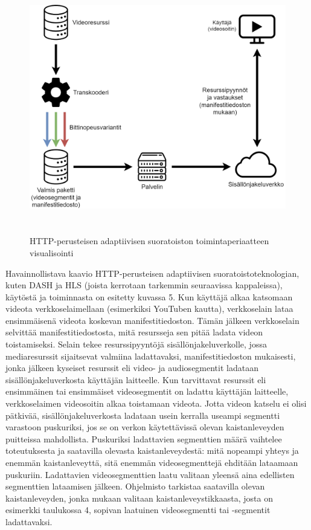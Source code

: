 \documentclass[finnish, 12pt, a4paper, elec, utf8, a-1b, online]{aaltothesis}
\begin{document}
\begin{figure}[htb]
  \centering
  \includegraphics[height=11cm]{./img/abr-streaming.png}
  \caption{HTTP-perusteisen adaptiivisen suoratoiston toimintaperiaatteen visualisointi \label{kuva5}}
\end{figure}

\noindent Havainnollistava kaavio HTTP-perusteisen adaptiivisen suoratoistoteknologian, kuten DASH ja HLS (joista kerrotaan tarkemmin seuraavissa kappaleissa), käytöstä ja toiminnasta on esitetty kuvassa 5. Kun käyttäjä alkaa katsomaan videota verkkoselaimellaan (esimerkiksi YouTuben kautta), verkkoselain lataa ensimmäisenä videota koskevan manifestitiedoston. Tämän jälkeen verkkoselain selvittää manifestitiedostosta, mitä resursseja sen pitää ladata videon toistamiseksi. Selain tekee resurssipyyntöjä sisällönjakeluverkolle, jossa mediaresurssit sijaitsevat valmiina ladattavaksi, manifestitiedoston mukaisesti, jonka jälkeen kyseiset resurssit eli video- ja audiosegmentit ladataan sisällönjakeluverkosta käyttäjän laitteelle. Kun tarvittavat resurssit eli ensimmäinen tai ensimmäiset videosegmentit on ladattu käyttäjän laitteelle, verkkoselaimen videosoitin alkaa toistamaan videota. Jotta videon katselu ei olisi pätkivää, sisällönjakeluverkosta ladataan usein kerralla useampi segmentti varastoon puskuriksi, jos se on verkon käytettävissä olevan kaistanleveyden puitteissa mahdollista. Puskuriksi ladattavien segmenttien määrä vaihtelee toteutuksesta ja saatavilla olevasta kaistanleveydestä: mitä nopeampi yhteys ja enemmän kaistanleveyttä, sitä enemmän videosegmenttejä ehditään lataamaan puskuriin. Ladattavien videosegmenttien laatu valitaan yleensä aina edellisten segmenttien lataamisen jälkeen. Ohjelmisto tarkistaa saatavilla olevan kaistanleveyden, jonka mukaan valitaan kaistanleveystikkaasta, josta on esimerkki taulukossa 4, sopivan laatuinen videosegmentti tai -segmentit ladattavaksi. \\
\end{document}
